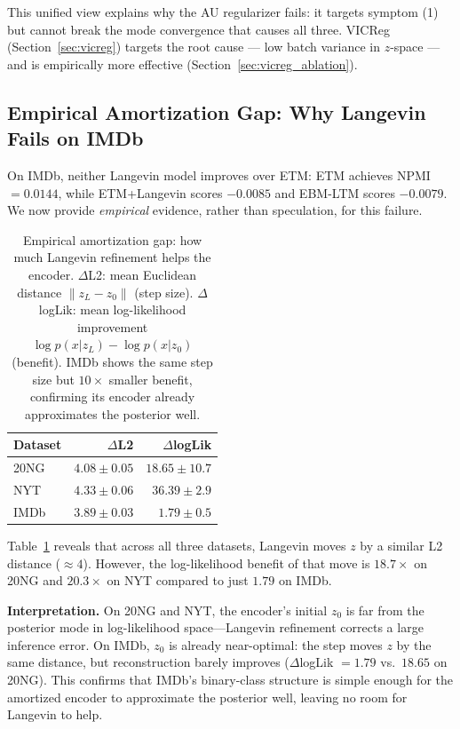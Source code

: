 \documentclass[10pt]{article}
\begin{document}
This unified view explains why the AU regularizer fails: it targets symptom (1) but
cannot break the mode convergence that causes all three. VICReg (Section~\ref{sec:vicreg})
targets the root cause --- low batch variance in $z$-space --- and is empirically more
effective (Section~\ref{sec:vicreg_ablation}).

\subsection{Empirical Amortization Gap: Why Langevin Fails on IMDb}
\label{sec:amort_gap_empirical}

On IMDb, neither Langevin model improves over ETM: ETM achieves NPMI $= 0.0144$,
while ETM+Langevin scores $-0.0085$ and EBM-LTM scores $-0.0079$.
We now provide \emph{empirical} evidence, rather than speculation, for this failure.

\begin{table}[h]
\centering
\caption{Empirical amortization gap: how much Langevin refinement helps the encoder.
$\Delta$L2: mean Euclidean distance $\|z_L - z_0\|$ (step size).
$\Delta$logLik: mean log-likelihood improvement $\log p(x|z_L) - \log p(x|z_0)$ (benefit).
IMDb shows the same step size but $10\times$ smaller benefit, confirming
its encoder already approximates the posterior well.}
\label{tab:amort_gap}
\small
\begin{tabular}{lrr}
\hline
\textbf{Dataset} & \textbf{$\Delta$L2} & \textbf{$\Delta$logLik} \\
\hline
20NG  & $4.08 \pm 0.05$ & $\mathbf{18.65} \pm 10.7$ \\
NYT   & $4.33 \pm 0.06$ & $\mathbf{36.39} \pm 2.9$ \\
IMDb  & $3.89 \pm 0.03$ & $1.79 \pm 0.5$ \\
\hline
\end{tabular}
\end{table}

Table~\ref{tab:amort_gap} reveals that across all three datasets, Langevin moves
$z$ by a similar L2 distance ($\approx 4$). However, the log-likelihood benefit
of that move is $18.7\times$ on 20NG and $20.3\times$ on NYT compared to just $1.79$ on IMDb.

\textbf{Interpretation.} On 20NG and NYT, the encoder's initial $z_0$ is far from
the posterior mode in log-likelihood space---Langevin refinement corrects a
large inference error. On IMDb, $z_0$ is already near-optimal: the step moves $z$
by the same distance, but reconstruction barely improves ($\Delta$logLik $= 1.79$
vs.\ $18.65$ on 20NG). This confirms that IMDb's binary-class structure is simple
enough for the amortized encoder to approximate the posterior well, leaving no
room for Langevin to help.
\end{document}
